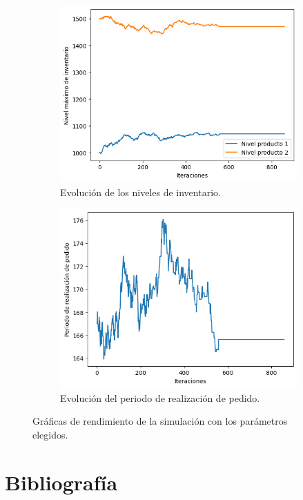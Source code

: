 \documentclass[a4paper,12pt]{article}
\begin{document}
\begin{figure}[H]
\begin{subfigure}{.45\textwidth}
			\centering
			\includegraphics[width=\textwidth]{include/ultima_ejec/niv_inv.png}
			\caption{Evolución de los niveles de inventario. }
		\end{subfigure}
		\hfill
		\begin{subfigure}{.45\textwidth}
			\centering
			\includegraphics[width=\textwidth]{include/ultima_ejec/periodo.png}
			\caption{Evolución del periodo de realización de pedido. }
		\end{subfigure}
		\caption{Gráficas de rendimiento de la simulación con los parámetros elegidos.}
		\label{result-graphs}
	\end{figure}
	
	\newpage
	\section*{Bibliografía}
	
	
	
\end{document}
